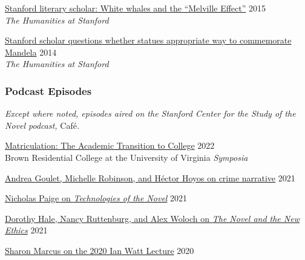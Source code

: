 \documentclass[
  12pt,
  letterpaper,
]{article}
\begin{document}
\href{https://web.archive.org/web/20210810125202/https://news.stanford.edu/news/2015/may/melville-scholar-boone-051115.html}{Stanford
literary scholar: White whales and the ``Melville Effect''}
\hfill 2015\\
\hspace*{0.333em} \emph{The Humanities at Stanford}

\href{https://web.archive.org/web/20220611230152/https://news.stanford.edu/pr/2014/pr-mandela-statue-parker-120314.html}{Stanford
scholar questions whether statues appropriate way to commemorate
Mandela} \hfill 2014\\
\hspace*{0.333em} \emph{The Humanities at Stanford}

\hypertarget{podcast-episodes}{%
\subsubsection{Podcast Episodes}\label{podcast-episodes}}

\emph{Except where noted, episodes aired on the Stanford Center
for the Study of the Novel podcast, }Café\emph{.}

\href{https://virginiaaudio.org/\#/symposia/}{Matriculation: The
Academic Transition to College} \hfill 2022\\
\hspace*{0.333em} Brown Residential College at the University of
Virginia \emph{Symposia}

\href{https://web.archive.org/web/20220429010015/https://novel.stanford.edu/csn-cafe/2021/7/23/crime-narratives-with-andrea-goulet-michelle-robinson-and-hctor-hoyos-43021-je87a}{Andrea
Goulet, Michelle Robinson, and Héctor Hoyos on crime narrative}
\hfill 2021

\href{https://web.archive.org/web/20220429093420/https://novel.stanford.edu/csn-cafe/2021/7/23/nicholas-paige-technologies-of-the-novel-2821}{Nicholas
Paige on \emph{Technologies of the Novel}} \hfill 2021

\href{https://web.archive.org/web/20220429093353/https://novel.stanford.edu/csn-cafe/2021/7/23/books-at-the-center-dorothy-hale-the-novel-and-the-new-ethics-11521}{Dorothy
Hale, Nancy Ruttenburg, and Alex Woloch on \emph{The Novel and the New
Ethics}} \hfill 2021

\href{https://web.archive.org/web/20220429093326/https://novel.stanford.edu/csn-cafe/2021/7/23/sharon-marcus-on-her-ian-watt-lecture-103020}{Sharon
Marcus on the 2020 Ian Watt Lecture} \hfill 2020
\end{document}
